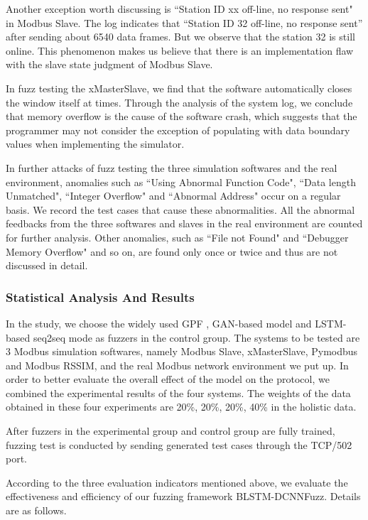 Another exception worth discussing is ``Station ID xx off-line, no response sent" in Modbus Slave. The log indicates that “Station ID 32 off-line, no response sent” after sending about 6540 data frames. But we observe that the station 32 is still online. This phenomenon makes us believe that there is an implementation flaw with the slave state judgment of Modbus Slave.

In fuzz testing the xMasterSlave, we find that the software automatically closes the window itself at times. Through the analysis of the system log, we conclude that memory overflow is the cause of the software crash, which suggests that the programmer may not consider the exception of populating with data boundary values when implementing the simulator. 

In further attacks of fuzz testing the three simulation softwares and the real environment, anomalies such as ``Using Abnormal Function Code", ``Data length Unmatched", ``Integer Overflow" and ``Abnormal Address" occur on a regular basis. We record the test cases that cause these abnormalities. All the abnormal feedbacks from the three softwares and slaves in the real environment are counted for further analysis. Other anomalies, such as ``File not Found" and ``Debugger Memory Overflow" and so on, are found only once or twice and thus are not discussed in detail.

\subsubsection{Statistical Analysis And Results}
In the study, we choose the widely used GPF \cite{demott2007revolutionizing}, GAN-based model and LSTM-based seq2seq mode as fuzzers in the control group. The systems to be tested are 3 Modbus simulation softwares, namely Modbus Slave, xMasterSlave, Pymodbus and Modbus RSSIM, and the real Modbus network environment we put up. In order to better evaluate the overall effect of the model on the protocol, we combined the experimental results of the four systems. The weights of the data obtained in these four experiments are 20\%, 20\%, 20\%, 40\% in the holistic data.

After fuzzers in the experimental group and control group are fully trained, fuzzing test is conducted by sending generated test cases through the TCP/502 port.

According to the three evaluation indicators mentioned above, we evaluate the effectiveness and efficiency of our fuzzing framework BLSTM-DCNNFuzz. Details are as follows.

